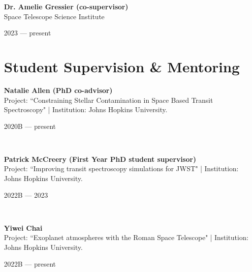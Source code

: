 \documentclass[12pt, a4paper]{article} %
\begin{document}
\begin{minipage}[t]{0.7\textwidth}
\begin{flushleft}%
  \setlength{\leftskip}{0.2cm}%
\textbf{Dr. Amelie Gressier (co-supervisor)}\\
Space Telescope Science Institute
\end{flushleft}
\end{minipage}
\begin{minipage}[t]{0.3\textwidth}
\hfill 2023 --- present
\end{minipage}

\section*{Student Supervision \& Mentoring}

\begin{minipage}[t]{0.7\textwidth}
\begin{flushleft}%
  \setlength{\leftskip}{0.2cm}%
\textbf{Natalie Allen (PhD co-advisor)}\\
Project: ``Constraining Stellar Contamination in Space Based Transit Spectroscopy" | Institution: Johns Hopkins University.
\end{flushleft}
\end{minipage}
\begin{minipage}[t]{0.3\textwidth}
\hfill 2020B --- present
\end{minipage}\\

\begin{minipage}[t]{0.7\textwidth}
\begin{flushleft}%
  \setlength{\leftskip}{0.2cm}%
\textbf{Patrick McCreery (First Year PhD student supervisor)}\\
Project: ``Improving transit spectroscopy simulations for JWST" | Institution: Johns Hopkins University.
\end{flushleft}
\end{minipage}
\begin{minipage}[t]{0.3\textwidth}
\hfill 2022B --- 2023
\end{minipage}\\

\begin{minipage}[t]{0.7\textwidth}
\begin{flushleft}%
  \setlength{\leftskip}{0.2cm}%
\textbf{Yiwei Chai}\\
Project: ``Exoplanet atmospheres with the Roman Space Telescope" | Institution: Johns Hopkins University.
\end{flushleft}
\end{minipage}
\begin{minipage}[t]{0.3\textwidth}
\hfill 2022B --- present
\end{minipage}\\
\end{document}
